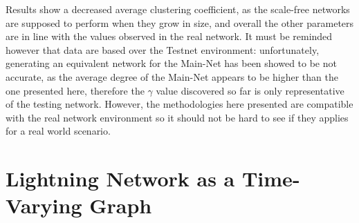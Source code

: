	Results show a decreased average clustering coefficient, as the scale-free networks are supposed to perform when they grow in size, and overall the other parameters are in line with the values observed in the real network. It must be reminded however that data are based over the Testnet environment: unfortunately, generating an equivalent network for the Main-Net has been showed to be not accurate, as the average degree of the Main-Net appears to be higher than the one presented here, therefore the $\gamma$ value discovered so far is only representative of the testing network. However, the methodologies here presented are compatible with the real network environment so it should not be hard to see if they applies for a real world scenario.

	\section{Lightning Network as a Time-Varying Graph}
	
